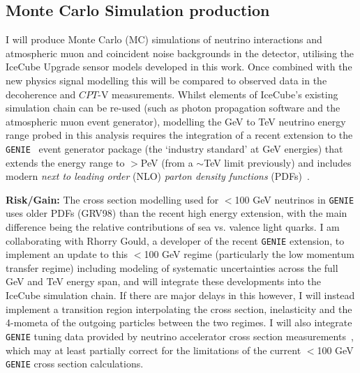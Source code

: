 \documentclass[a4paper,11pt]{article}
\begin{document}
\subsection{Monte Carlo Simulation production}

I will produce Monte Carlo (MC) simulations of neutrino interactions and atmospheric muon and coincident noise backgrounds in the detector, utilising the IceCube Upgrade sensor models developed in this work. Once combined with the new physics signal modelling this will be compared to observed data in the decoherence and $CPT$-V measurements. Whilst elements of IceCube's existing simulation chain can be re-used (such as photon propagation software and the atmospheric muon event generator), modelling the GeV to TeV neutrino energy range probed in this analysis requires the integration of a recent extension to the \texttt{GENIE}~\cite{Andreopoulos:2009zz} event generator package (the `industry standard' at GeV energies) that extends the energy range to $>$PeV (from a $\sim$TeV limit previously) and includes modern \textit{next to leading order} (NLO) \textit{parton density functions} (PDFs)~\cite{Garcia:2019hze}. 

\textbf{Risk/Gain:} The cross section modelling used for $<$100 GeV neutrinos in \texttt{GENIE} uses older PDFs (GRV98) than the recent high energy extension, with the main difference being the relative contributions of sea vs. valence light quarks. I am collaborating with Rhorry Gould, a developer of the recent \texttt{GENIE} extension, to implement an update to this $<$100 GeV regime (particularly the low momentum transfer regime) including modeling of systematic uncertainties across the full GeV and TeV energy span, and will integrate these developments into the IceCube simulation chain. If there are major delays in this however, I will instead implement a transition region interpolating the cross section, inelasticity and the 4-mometa of the outgoing particles between the two regimes. I will also integrate \texttt{GENIE} tuning data provided by neutrino accelerator cross section measurements~\cite{Stowell:2019zsh, Acero:2020eit}, which may at least partially correct for the limitations of the current $<$100 GeV \texttt{GENIE} cross section calculations.


\end{document}
